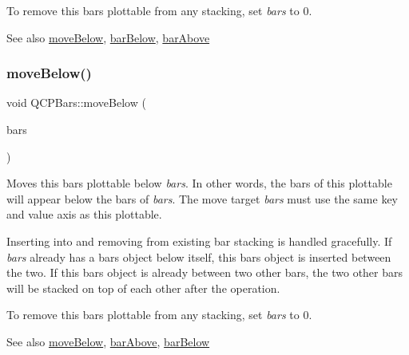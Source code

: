 To remove this bars plottable from any stacking, set {\itshape bars} to 0.

\begin{DoxySeeAlso}{See also}
\hyperlink{classQCPBars_a69fc371346980f19177c3d1ecdad78ee}{move\+Below}, \hyperlink{classQCPBars_a1b58664864b141f45e02044a855b3213}{bar\+Below}, \hyperlink{classQCPBars_ab97f2acd9f6cb40d2cc3c33d278f0e78}{bar\+Above} 
\end{DoxySeeAlso}
\mbox{\label{classQCPBars_a69fc371346980f19177c3d1ecdad78ee}} 
\subsubsection{\texorpdfstring{move\+Below()}{moveBelow()}}
{\footnotesize\ttfamily void Q\+C\+P\+Bars\+::move\+Below (\begin{DoxyParamCaption}\item[{\hyperlink{classQCPBars}{Q\+C\+P\+Bars} $\ast$}]{bars }\end{DoxyParamCaption})}

Moves this bars plottable below {\itshape bars}. In other words, the bars of this plottable will appear below the bars of {\itshape bars}. The move target {\itshape bars} must use the same key and value axis as this plottable.

Inserting into and removing from existing bar stacking is handled gracefully. If {\itshape bars} already has a bars object below itself, this bars object is inserted between the two. If this bars object is already between two other bars, the two other bars will be stacked on top of each other after the operation.

To remove this bars plottable from any stacking, set {\itshape bars} to 0.

\begin{DoxySeeAlso}{See also}
\hyperlink{classQCPBars_a69fc371346980f19177c3d1ecdad78ee}{move\+Below}, \hyperlink{classQCPBars_ab97f2acd9f6cb40d2cc3c33d278f0e78}{bar\+Above}, \hyperlink{classQCPBars_a1b58664864b141f45e02044a855b3213}{bar\+Below} 
\end{DoxySeeAlso}
\mbox{\label{classQCPBars_a121f899c27af3186fe93dcd0eb98f49b}} 
